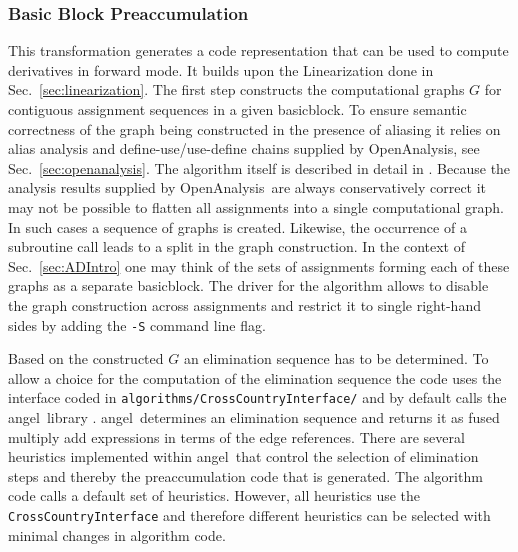 \documentclass{book}
\newcommand{\angel}{angel}
\newcommand{\basicblock}{basicblock}
\newcommand{\OpenAnalysis}{OpenAnalysis}
\newcommand{\refsec}[1]{{Sec.~\ref{#1}}}
\begin{document}
\subsubsection{Basic Block Preaccumulation}\label{sec:BBPreacc}

This transformation generates a code representation that can be used 
to compute derivatives in forward mode. It builds upon the Linearization
done in \refsec{sec:linearization}. 
The first step constructs the 
computational graphs $G$ 
for contiguous 
assignment sequences in a given \basicblock. To ensure semantic 
correctness of the graph being constructed in the presence of 
aliasing it relies on alias analysis and define-use/use-define chains 
supplied by \OpenAnalysis, see \refsec{sec:openanalysis}.
The algorithm itself is described in detail in \cite{Utke2005FBB}.
Because the analysis results supplied by \OpenAnalysis\ are always 
conservatively correct it may not be possible to flatten all 
assignments into a single computational graph. In such cases 
a sequence of graphs is created. Likewise, the occurrence 
of a subroutine call leads to a split in the graph construction. 
In the context of \refsec{sec:ADIntro} one may think of the sets of 
assignments forming each of these graphs as a separate \basicblock. 
The driver for the algorithm allows to disable 
the graph construction across assignments and restrict it to 
single right-hand sides by adding the \lstinline{-S} command 
line flag. 

Based on the constructed $G$ an elimination sequence has to be determined.
To allow a choice for the computation of the elimination sequence 
the code uses the interface coded in \lstinline{algorithms/CrossCountryInterface/}
and by default calls the \angel\ library \cite{angelWeb,Albrecht2003Mth,Naumann2003SAf}.
\angel\ determines an elimination sequence and returns it as 
fused multiply add expressions in terms of the edge references.
There are several heuristics implemented within \angel\ that control 
the selection of elimination steps and thereby the preaccumulation code 
that is generated.  The algorithm code calls a default set of heuristics. 
However, all heuristics use the \lstinline{CrossCountryInterface} and therefore 
different heuristics can be selected with minimal changes in algorithm code.   
\end{document}
